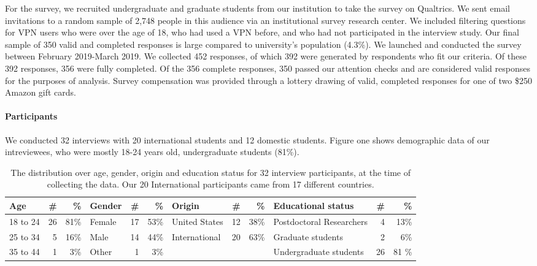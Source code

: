 For the survey, we recruited undergraduate and graduate students from our
institution to take the survey on Qualtrics. We sent email invitations to a
random sample of 2,748 people in this audience via an institutional survey
research center. We included filtering questions for VPN users who were over
the age of 18, who had used a VPN before, and who had not participated in the
interview study. Our final sample of 350 valid and completed responses is
large compared to university's population (4.3\%). We launched and conducted
the survey between February 2019-March 2019. We collected 452 responses, of
which 392 were generated by respondents who fit our criteria. Of these 392
responses, 356 were fully completed. Of the 356 complete responses, 350 passed
our attention checks and are considered valid responses for the purposes of
analysis. Survey compensation was provided through a lottery drawing of valid,
completed responses for one of two \$250 Amazon gift cards.

\paragraph{Participants}
We conducted 32 interviews with 20
international students and 12 domestic students. Figure one shows demographic data of our intreviewees, who were mostly 18-24 years old, undergraduate students (81\%).

\begin{table*}[h!]
\centering
\begin{tabular}{l r r |l r r|l r r|l r r} 
 \hline
 Age & \# & \% & Gender & \# & \% & Origin & \# & \% & Educational status & \# & \% \\
\hline
18 to 24 & 26 & 81\% & Female & 17 & 53\% & United States & 12 & 38\% & Postdoctoral Researchers & 4 & 13\% \\
25 to 34 & 5 & 16\% & Male & 14 & 44\% & International & 20 & 63\% & Graduate students & 2 & 6\% \\
35 to 44 & 1 & 3\% & Other & 1 & 3\% & & & & Undergraduate students & 26 & 81 \% \\
 \hline
\end{tabular}
\caption{The distribution over age, gender, origin and education status for 32 interview participants, at the time of collecting the data. Our 20 International participants came from 17 different countries.}
\label{table:1}
\end{table*}

